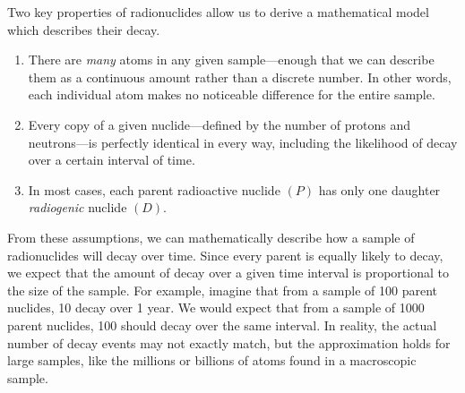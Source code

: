 \documentclass[addpoints, 12pt]{exam}
\begin{document}
Two key properties of radionuclides allow us to derive a mathematical model which describes their decay.
\begin{enumerate}
	\item There are \emph{many} atoms in any given sample---enough that we can describe them as a continuous amount rather than a discrete number. In other words, each individual atom makes no noticeable difference for the entire sample.
	\item Every copy of a given nuclide---defined by the number of protons and neutrons---is perfectly identical in every way, including the likelihood of decay over a certain interval of time.
	\item In most cases, each parent radioactive nuclide $(P)$ has only one daughter \emph{radiogenic} nuclide $(D)$.
\end{enumerate}
From these assumptions, we can mathematically describe how a sample of radionuclides will decay over time. Since every parent is equally likely to decay, we expect that the amount of decay over a given time interval is proportional to the size of the sample. For example, imagine that from a sample of 100 parent nuclides, 10 decay over 1 year. We would expect that from a sample of \num{1000} parent nuclides, 100 should decay over the same interval. In reality, the actual number of decay events may not exactly match, but the approximation holds for large samples, like the millions or billions of atoms found in a macroscopic sample. 
\end{document}
